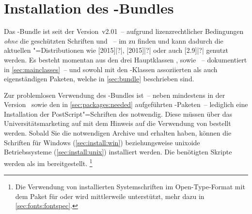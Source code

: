 \section{Installation des \TUDScript-Bundles}
%
%
%
%
%
Das \TUDScript-Bundle ist seit der Version~v2.01~-- aufgrund lizenzrechtlicher 
Bedingungen \emph{ohne} die geschützten Schriften \Univers und \DIN~-- im \CTAN
zu finden und kann dadurch die aktuellen "=Distributionen wie 
[2015]|?|, 
[2015]|?| oder auch
[2.9]|?| genutzt werden. Es besteht momentan aus 
den drei Hauptklassen ,  sowie 
~-- dokumentiert in \autoref{sec:mainclasses}~-- und sowohl 
mit den \TUDScript-Klassen assoziierten als auch eigenständigen Paketen, welche 
in \autoref{sec:bundle} beschrieben sind.

Zur problemlosen Verwendung des \TUDScript-Bundles ist~-- neben \KOMAScript{} 
mindestens in der Version~\vKOMAScript{} sowie den in 
\autoref{sec:packages:needed} aufgeführten -Paketen~-- lediglich 
eine Installation der PostScript"=Schriften des \TUDCDs notwendig. Diese müssen 
über das Universitätsmarketing auf 
 mit 
dem Hinweis auf die Verwendung von  bestellt werden. Sobald Sie 
die notwendigen Archive  und  
erhalten haben, können die Schriften für Windows (\autoref{sec:install:win}) 
beziehungsweise unixoide Betriebssysteme (\autoref{sec:install:unix}) 
installiert werden. Die benötigten Skripte werden als 
im \GitHubRepo* bereitgestellt.%
\footnote{%
  Die Verwendung von installierten Systemschriften im Open-Type-Format mit dem 
  Paket  für  oder  wird 
  mittlerweile unterstützt, mehr dazu in \autoref{sec:fonts:fontspec}.%
}



